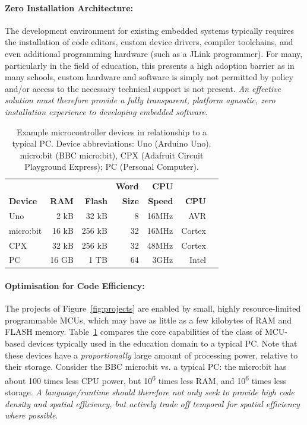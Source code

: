 \paragraph{Zero Installation Architecture:}
The development environment for existing embedded systems typically requires the installation of code editors, custom device drivers, compiler toolchains, and even additional programming hardware (such as a JLink programmer). For many, particularly in the field of education, this presents a high adoption barrier as in many schools, custom hardware and software is simply not permitted by policy and/or access to the necessary technical support is not present. \emph{An effective solution must therefore provide a fully transparent, platform agnostic, zero installation experience to developing embedded software}.

\begin{table}[t]
    \centering
    \begin{tabular}{|l|r|r|r|r|r|r|}
    \hline
                           &          &              & \bf{Word}  & \bf{CPU} &            \\
    \bf{Device}            & \bf{RAM} & \bf{Flash}   & \bf{Size}  & \bf{Speed} & \bf{CPU}  \\ \hline
    Uno            & 2 kB       & 32 kB      & 8          & 16MHz & AVR       \\ \hline
    micro:bit          & 16 kB      & 256 kB     & 32         & 16MHz & Cortex     \\ \hline
    CPX           & 32 kB      & 256 kB     & 32         & 48MHz & Cortex    \\ \hline
    PC             & 16 GB      & 1 TB       & 64         & 3GHz & Intel      \\ \hline
    \end{tabular}
    \setlength{\textfloatsep}{-10pt}
    \caption{\label{table:devices}Example microcontroller devices in relationship to a typical PC. Device abbreviations: Uno (Arduino Uno), micro:bit (BBC micro:bit), CPX (Adafruit Circuit Playground Express); PC (Personal Computer).}
    \vspace{-20pt}
\end{table}

\paragraph{Optimisation for Code Efficiency:}
The projects of Figure~\ref{fig:projects} are enabled by small, highly resource-limited programmable MCUs, which may have as little as a few kilobytes of RAM and FLASH memory.
Table~\ref{table:devices} compares the core capabilities of the class of MCU-based devices typically used in the education domain to a typical PC. Note that these devices have a \emph{proportionally} large amount of processing power, relative to their storage. Consider the BBC micro:bit vs. a typical PC: the micro:bit has about 100 times less CPU power, but 10\textsuperscript{6} times less RAM, and 10\textsuperscript{6} times less storage. \emph{A language/runtime should therefore not only seek to provide high code density and spatial efficiency, but actively trade off temporal for spatial efficiency where possible}.

